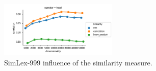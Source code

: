 \begin{figure}[h]
  \centering

  \includegraphics[width=0.5\textwidth]{supplement/figures/SimLex999-interaction-similarity}

  \caption{SimLex-999 influence of the similarity measure.}
  \label{fig:SimLex999-similarity}
\end{figure}
